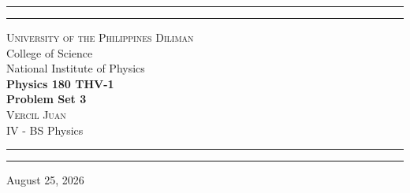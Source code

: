 \begin{titlepage}
    \vspace*{2.5in}
    \hrule
    \vspace{3pt}
    \hrule
    \vspace{0.25in}
    \begin{center}
    {\Large \textsc{
		University of the Philippines Diliman}\\[4pt]
		College of Science\\[4pt]
		National Institute of Physics}\\ \vspace{0.5cm}
		{\Huge\textbf{
			Physics 180 THV-1
		\\[5pt]
			Problem Set 3
		}}
		\\[0.5cm]
		{\Large \textsc{
			Vercil Juan
		}}\\[5pt] {\large 
			IV - BS Physics
	}
    \end{center}
    \vspace{0.25in}
    \hrule
    \vspace{3pt}
    \hrule 
    \vfill
    \begin{center}
    {\large 
		August 25, 2026
	}
    \end{center}
\end{titlepage}
